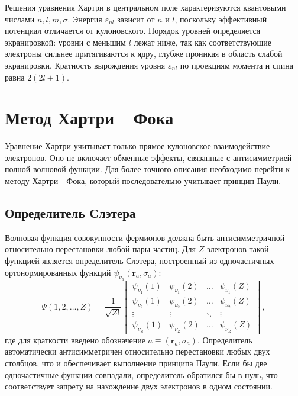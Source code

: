 \documentclass[a4paper, 12pt]{article}
\numberwithin{equation}{section}
\begin{document}
Решения уравнения Хартри в центральном поле характеризуются квантовыми числами $n, l, m, \sigma$. Энергия $\varepsilon_{nl}$ зависит от $n$ и $l$, поскольку эффективный потенциал отличается от кулоновского. Порядок уровней определяется экранировкой: уровни с меньшим $l$ лежат ниже, так как соответствующие электроны сильнее притягиваются к ядру, глубже проникая в область слабой экранировки. Кратность вырождения уровня $\varepsilon_{nl}$ по проекциям момента и спина равна $2(2l+1)$.

\section{Метод Хартри---Фока}
\label{sec:hartree_fock_method}

Уравнение Хартри учитывает только прямое кулоновское взаимодействие электронов. Оно не включает обменные эффекты, связанные с антисимметрией полной волновой функции. Для более точного описания необходимо перейти к методу Хартри---Фока, который последовательно учитывает принцип Паули.

\subsection{Определитель Слэтера}
\label{subsec:slater_determinant}

Волновая функция совокупности фермионов должна быть антисимметричной относительно перестановки любой пары частиц. Для $Z$ электронов такой функцией является определитель Слэтера, построенный из одночастичных ортонормированных функций $\psi_{\nu_a}(\bm{r}_a, \sigma_a)$:
\begin{equation}
\label{eq:slater_det}
\Psi(1, 2, \dots, Z) = \frac{1}{\sqrt{Z!}}
\begin{vmatrix}
\psi_{\nu_1}(1) & \psi_{\nu_1}(2) & \dots & \psi_{\nu_1}(Z) \\
\psi_{\nu_2}(1) & \psi_{\nu_2}(2) & \dots & \psi_{\nu_2}(Z) \\
\vdots & \vdots & \ddots & \vdots \\
\psi_{\nu_Z}(1) & \psi_{\nu_Z}(2) & \dots & \psi_{\nu_Z}(Z)
\end{vmatrix},
\end{equation}
где для краткости введено обозначение $a \equiv (\bm{r}_a, \sigma_a)$. Определитель автоматически антисимметричен относительно перестановки любых двух столбцов, что и обеспечивает выполнение принципа Паули. Если бы две одночастичные функции совпадали, определитель обратился бы в нуль, что соответствует запрету на нахождение двух электронов в одном состоянии.
\end{document}
